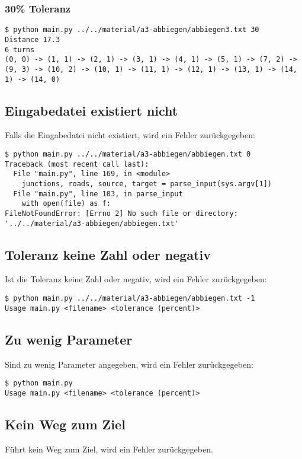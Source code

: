 \documentclass[a4paper,10pt,ngerman]{scrartcl}
\begin{document}
\subsubsection{30\% Toleranz}
\begin{lstlisting}
$ python main.py ../../material/a3-abbiegen/abbiegen3.txt 30
Distance 17.3
6 turns
(0, 0) -> (1, 1) -> (2, 1) -> (3, 1) -> (4, 1) -> (5, 1) -> (7, 2) -> (9, 3) -> (10, 2) -> (10, 1) -> (11, 1) -> (12, 1) -> (13, 1) -> (14, 1) -> (14, 0)
\end{lstlisting}

\subsection{Eingabedatei existiert nicht}
Falls die Eingabedatei nicht existiert, wird ein Fehler zurückgegeben:
\begin{lstlisting}
$ python main.py ../../material/a3-abbiegen/abbiegen.txt 0
Traceback (most recent call last):
  File "main.py", line 169, in <module>
    junctions, roads, source, target = parse_input(sys.argv[1])
  File "main.py", line 103, in parse_input
    with open(file) as f:
FileNotFoundError: [Errno 2] No such file or directory: '../../material/a3-abbiegen/abbiegen.txt'
\end{lstlisting}

\subsection{Toleranz keine Zahl oder negativ}
Ist die Toleranz keine Zahl oder negativ, wird ein Fehler zurückgegeben:
\begin{lstlisting}
$ python main.py ../../material/a3-abbiegen/abbiegen.txt -1
Usage main.py <filename> <tolerance (percent)>
\end{lstlisting}

\subsection{Zu wenig Parameter}
Sind zu wenig Parameter angegeben, wird ein Fehler zurückgegeben:
\begin{lstlisting}
$ python main.py
Usage main.py <filename> <tolerance (percent)>
\end{lstlisting}

\subsection{Kein Weg zum Ziel}
Führt kein Weg zum Ziel, wird ein Fehler zurückgegeben.
\end{document}
